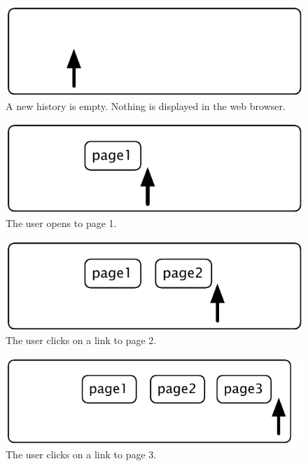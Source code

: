 \documentclass[a4paper,10pt,twoside]{book}
\begin{document}
\begin{figure}[!ht]
\centerline{\includegraphics[scale=0.5]{emptyStef}}
\caption{A new history is empty. Nothing is displayed in the web browser.}
\label{fig:emptyStream}
\vspace{.2in}
\end{figure}

\begin{figure}[!ht]
\centerline{\includegraphics[scale=0.5]{page1Stef}}
\caption{The user opens to page 1.}
\label{fig:page1}
\vspace{.2in}
\end{figure}

\begin{figure}[!ht]
\centerline{\includegraphics[scale=0.5]{page2Stef}}
\caption{The user clicks on a link to page 2.}
\label{fig:page2}
\vspace{.2in}
\end{figure}

\begin{figure}[!ht]
\centerline{\includegraphics[scale=0.5]{page3Stef}}
\caption{The user clicks on a link to page 3.}
\label{fig:page3}
\vspace{.2in}
\end{figure}
\end{document}
